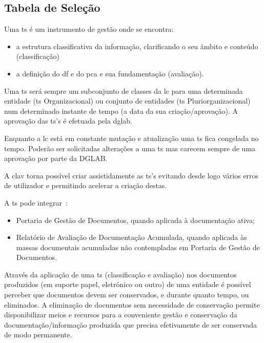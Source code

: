 \subsection{Tabela de Seleção}

Uma \acrfull{ts} é um instrumento de gestão onde se encontra:~\cite{tsDef}
\begin{itemize}
    \item a estrutura classificativa da informação, clarificando o seu âmbito e conteúdo (classificação)
    \item a definição do \acrlong{df} e do \acrlong{pca} e sua fundamentação (avaliação).
\end{itemize}

Uma \acrshort{ts} será sempre um subconjunto de classes da \acrshort{lc} para uma determinada 
entidade (\acrshort{ts} Organizacional) ou conjunto de entidades (\acrshort{ts} Pluriorganizacional) 
num determinado instante de tempo (a data da sua criação/aprovação). 
A aprovação das \acrshort{ts}'s é efetuada pela \acrshort{dglab}.

Enquanto a \acrshort{lc} está em constante mutação e atualização uma \acrshort{ts} fica congelada no tempo.
Poderão ser solicitadas alterações a uma \acrshort{ts} mas carecem sempre de uma aprovação por parte da DGLAB.


A \acrshort{clav} torna possível criar assistidamente as \acrshort{ts}'s evitando desde logo vários erros de 
utilizador e permitindo acelerar a criação destas.

A \acrshort{ts} pode integrar~\cite{tsDef}:
\begin{itemize}
    \item Portaria de Gestão de Documentos, quando aplicada à documentação ativa;
    \item Relatório  de  Avaliação  de  Documentação  Acumulada, quando aplicada às massas documentais acumuladas 
    não contempladas em Portaria de Gestão de Documentos.
\end{itemize}

Através da aplicação de uma \acrshort{ts} (classificação e avaliação) nos documentos produzidos 
(em suporte papel, eletrónico ou outro) de uma entidade é possível perceber que documentos devem ser conservados, 
e durante quanto tempo, ou eliminados. A eliminação de documentos sem necessidade de conservação permite 
disponibilizar meios e recursos para a conveniente gestão e conservação da documentação/informação produzida 
que precisa efetivamente de ser conservada de modo permanente.~\cite{ts}

